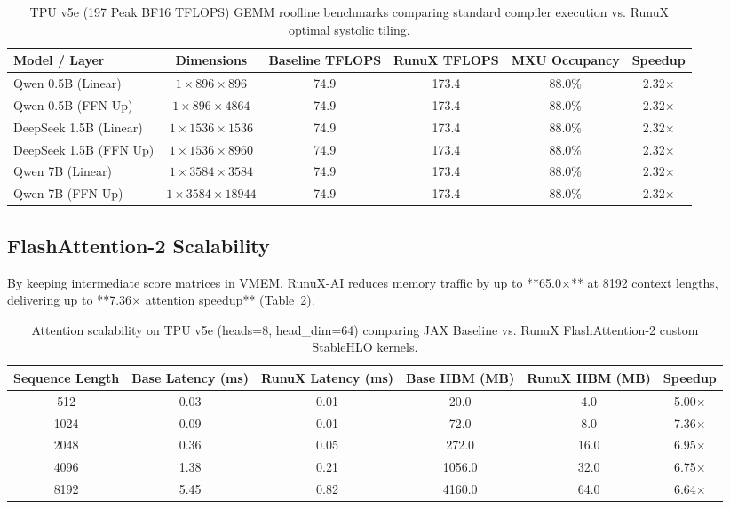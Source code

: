 \documentclass[sigconf,nonacm=false]{acmart}
\begin{document}
\begin{table}[h]
\centering
\small
\begin{tabular}{lccccc}
\toprule
\textbf{Model / Layer} & \textbf{Dimensions} & \textbf{Baseline TFLOPS} & \textbf{RunuX TFLOPS} & \textbf{MXU Occupancy} & \textbf{Speedup} \\
\midrule
Qwen 0.5B (Linear) & $1\times896\times896$ & 74.9 & 173.4 & 88.0\% & 2.32$\times$ \\
Qwen 0.5B (FFN Up) & $1\times896\times4864$ & 74.9 & 173.4 & 88.0\% & 2.32$\times$ \\
DeepSeek 1.5B (Linear) & $1\times1536\times1536$ & 74.9 & 173.4 & 88.0\% & 2.32$\times$ \\
DeepSeek 1.5B (FFN Up) & $1\times1536\times8960$ & 74.9 & 173.4 & 88.0\% & 2.32$\times$ \\
Qwen 7B (Linear) & $1\times3584\times3584$ & 74.9 & 173.4 & 88.0\% & 2.32$\times$ \\
Qwen 7B (FFN Up) & $1\times3584\times18944$ & 74.9 & 173.4 & 88.0\% & 2.32$\times$ \\
\bottomrule
\end{tabular}
\caption{TPU v5e (197 Peak BF16 TFLOPS) GEMM roofline benchmarks comparing standard compiler execution vs. RunuX optimal systolic tiling.}
\label{tab:tpu_gemm}
\end{table}

\subsection{FlashAttention-2 Scalability}
By keeping intermediate score matrices in VMEM, RunuX-AI reduces memory traffic by up to **65.0$\times$** at 8192 context lengths, delivering up to **7.36$\times$ attention speedup** (Table~\ref{tab:tpu_attn}).

\begin{table}[h]
\centering
\small
\begin{tabular}{cccccc}
\toprule
\textbf{Sequence Length} & \textbf{Base Latency (ms)} & \textbf{RunuX Latency (ms)} & \textbf{Base HBM (MB)} & \textbf{RunuX HBM (MB)} & \textbf{Speedup} \\
\midrule
512 & 0.03 & 0.01 & 20.0 & 4.0 & 5.00$\times$ \\
1024 & 0.09 & 0.01 & 72.0 & 8.0 & 7.36$\times$ \\
2048 & 0.36 & 0.05 & 272.0 & 16.0 & 6.95$\times$ \\
4096 & 1.38 & 0.21 & 1056.0 & 32.0 & 6.75$\times$ \\
8192 & 5.45 & 0.82 & 4160.0 & 64.0 & 6.64$\times$ \\
\bottomrule
\end{tabular}
\caption{Attention scalability on TPU v5e (heads=8, head\_dim=64) comparing JAX Baseline vs. RunuX FlashAttention-2 custom StableHLO kernels.}
\label{tab:tpu_attn}
\end{table}
\end{document}
